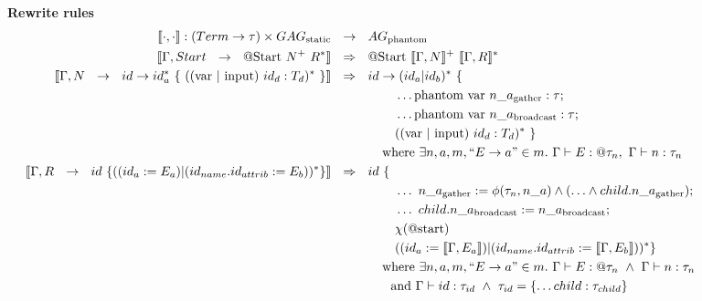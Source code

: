 \begin{figure*}
\begin{center}
\vspace{1em}

\textbf{Rewrite rules}
\begin{align*}
\llbracket \cdot, \cdot \rrbracket : (Term \rightarrow \tau) \times GAG_{\text{static}} & ~~\rightarrow~~ AG_{\text{phantom}}\\
\llbracket \Gamma, Start ~~ \rightarrow ~~ \text{@Start}~ N^{+} ~ R^{*} \rrbracket & ~~ \Rightarrow ~~ \text{@Start}~ \llbracket \Gamma, N \rrbracket ^{+} ~ \llbracket \Gamma, R \rrbracket ^{*} \\
\llbracket \Gamma, N ~~ \rightarrow ~~ id \rightarrow id_{a}^{*} ~ \{ ~ ((\text{var} ~ | ~ \text{input})~ id_d : T_d )^{*} ~ \} \rrbracket & ~~ \Rightarrow ~~ id \rightarrow (id_{a}|id_{b})^{*} ~ \{ \\
& ~~~~~~~~~~~~~~~ \ldots \text{phantom var} ~ n\_a_\text{gather} : \tau; ~~ \\ 
& ~~~~~~~~~~~~~~~ \ldots \text{phantom var} ~ n\_a_\text{broadcast} : \tau; \\
& ~~~~~~~~~~~~~~~ ((\text{var} ~ | ~ \text{input})~ id_d : T_d )^{*} ~\} \\
& ~~~~~~~~~~~~ \text{where} ~ \exists n, a, m, ``E \rightarrow a" \in m. ~  \Gamma \vdash E : @ \tau_n, ~ \Gamma \vdash n : \tau_n \\
\llbracket \Gamma, R ~~ \rightarrow ~~ id ~ \{  ((id_a := E_a) | (id_{name}.id_{attrib} := E_b))^{*} \} \rrbracket & ~~ \Rightarrow ~~ id ~ \{ \\
& ~~~~~~~~~~~~~~~ \ldots ~ n\_a_\text{gather} := \phi(\tau_{n}, n\_a) \wedge (\ldots \wedge child.n\_a_\text{gather}); ~~ \\
& ~~~~~~~~~~~~~~~ \ldots  ~ child.n\_a_\text{broadcast} := n\_a_\text{broadcast}; \\
& ~~~~~~~~~~~~~~~ \chi(\text{@start}) \\
& ~~~~~~~~~~~~~~~ ((id_a := \llbracket \Gamma, E_a \rrbracket ) | (id_{name}.id_{attrib} := \llbracket \Gamma, E_b \rrbracket ))^{*}  \} \\
& ~~~~~~~~~~~~ \text{where} ~ \exists n, a, m, ``E \rightarrow a" \in m. ~  \Gamma \vdash E : @ \tau_n ~ \wedge ~ \Gamma \vdash n : \tau_n \\
& ~~~~~~~~~~~~ ~~ \text{and} ~ \Gamma \vdash id : \tau_{id} ~ \wedge ~ \tau_{id} = \{ \ldots child : \tau_{child} \} \\

\end{align*}
\end{center}
\end{figure*}
